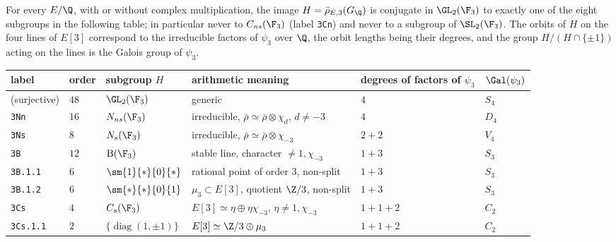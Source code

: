 \begin{theorem}\label{thm:galrep:mod3-images}
For every $E/\Q$, with or without complex multiplication, the image $H=\bar\rho_{E,3}(G_\Q)$ is conjugate in $\GL_2(\F_3)$ to exactly one of the eight
subgroups in the following table; in particular never to $C_{ns}(\F_3)$ (label \texttt{3Cn}) and never to a subgroup of $\SL_2(\F_3)$. The orbits of $H$
on the four lines of $E[3]$ correspond to the irreducible factors of $\psi_3$ over $\Q$, the orbit lengths being their degrees, and the group
$H/(H\cap\{\pm1\})$ acting on the lines is the Galois group of $\psi_3$.
\begin{center}\footnotesize\setlength{\tabcolsep}{3pt}
\begin{tabular}{llllll}
\toprule
label & order & subgroup $H$ & arithmetic meaning & degrees of factors of $\psi_3$ & $\Gal(\psi_3)$\\
\midrule
(surjective) & $48$ & $\GL_2(\F_3)$ & generic & $4$ & $S_4$\\
\texttt{3Nn} & $16$ & $N_{ns}(\F_3)$ & irreducible, $\bar\rho\simeq\bar\rho\otimes\chi_d$, $d\ne-3$ & $4$ & $D_4$\\
\texttt{3Ns} & $8$ & $N_s(\F_3)$ & irreducible, $\bar\rho\simeq\bar\rho\otimes\chi_{-3}$ & $2+2$ & $V_4$\\
\texttt{3B} & $12$ & $\mathrm B(\F_3)$ & stable line, character $\ne1,\chi_{-3}$ & $1+3$ & $S_3$\\
\texttt{3B.1.1} & $6$ & $\sm{1}{*}{0}{*}$ & rational point of order $3$, non-split & $1+3$ & $S_3$\\
\texttt{3B.1.2} & $6$ & $\sm{*}{*}{0}{1}$ & $\mu_3\subset E[3]$, quotient $\Z/3$, non-split & $1+3$ & $S_3$\\
\texttt{3Cs} & $4$ & $C_s(\F_3)$ & $E[3]\simeq\eta\oplus\eta\chi_{-3}$, $\eta\ne1,\chi_{-3}$ & $1+1+2$ & $C_2$\\
\texttt{3Cs.1.1} & $2$ & $\{\operatorname{diag}(1,\pm1)\}$ & $E[3]\simeq\Z/3\oplus\mu_3$ & $1+1+2$ & $C_2$\\
\bottomrule
\end{tabular}
\end{center}
\end{theorem}

